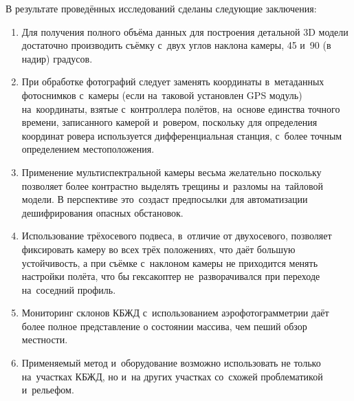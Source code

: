 В результате проведённых исследований сделаны следующие заключения:
\begin{enumerate}[noitemsep]\vspace{-8pt}
\item Для получения полного объёма данных для построения детальной 3D модели достаточно производить съёмку с~двух углов наклона камеры, 45 и~90 (в надир) градусов.
\item При обработке фотографий следует заменять координаты в~метаданных фотоснимков с~камеры (если на~таковой установлен GPS модуль) на~координаты, взятые с~контроллера полётов, на~основе единства точного времени, записанного камерой и~ровером, поскольку для определения координат ровера используется дифференциальная станция, с~более точным определением местоположения.
\item Применение мультиспектральной камеры весьма желательно поскольку позволяет более контрастно выделять трещины и~разломы на~тайловой модели. В перспективе это~создаст предпосылки для автоматизации дешифрирования опасных обстановок.
\item Использование трёхосевого подвеса, в~отличие от двухосевого, позволяет фиксировать камеру во всех трёх положениях, что даёт большую устойчивость, а при съёмке с~наклоном камеры не приходится менять настройки полёта, что бы гексакоптер не~разворачивался при переходе на~соседний профиль.
\item Мониторинг склонов КБЖД с~использованием аэрофотограмметрии даёт более полное представление о состоянии массива, чем пеший обзор местности.
\item Применяемый метод и~оборудование возможно использовать не только на~участках КБЖД, но и~на других участках со~схожей проблематикой и~рельефом.
\end{enumerate}
\vspace{-8pt}

